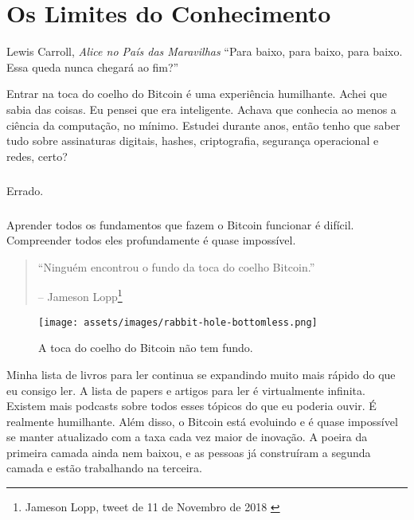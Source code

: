 \chapter{Os Limites do Conhecimento}
\label{les:7}

\begin{chapquote}{Lewis Carroll, \textit{Alice no País das Maravilhas}}
\enquote{Para baixo, para baixo, para baixo. Essa queda nunca chegará ao fim?}
\end{chapquote}

Entrar na toca do coelho do Bitcoin é uma experiência humilhante. Achei que sabia das coisas. Eu pensei que era inteligente. Achava que conhecia ao menos a ciência da computação, no mínimo. Estudei durante anos, então tenho que saber tudo sobre assinaturas digitais, hashes, criptografia, segurança operacional e redes, certo?

\paragraph{}
Errado.

\paragraph{}
Aprender todos os fundamentos que fazem o Bitcoin funcionar é difícil. Compreender todos eles profundamente é quase impossível.

\begin{quotation}\begin{samepage}
\enquote{Ninguém encontrou o fundo da toca do coelho Bitcoin.}
\begin{flushright} -- Jameson Lopp\footnote{Jameson Lopp, tweet de 11 de Novembro de 2018 \cite{lopp-tweet}}
\end{flushright}\end{samepage}\end{quotation}

\begin{figure}
  \centering
  \texttt{[image: assets/images/rabbit-hole-bottomless.png]}
  \caption{A toca do coelho do Bitcoin não tem fundo.}
  \label{fig:rabbit-hole-bottomless}
\end{figure}

Minha lista de livros para ler continua se expandindo muito mais rápido do que eu consigo ler. A lista de papers e artigos para ler é virtualmente infinita. Existem mais podcasts sobre todos esses tópicos do que eu poderia ouvir. É realmente humilhante. Além disso, o Bitcoin está evoluindo e é quase impossível se manter atualizado com a taxa cada vez maior de inovação. A poeira da primeira camada ainda nem baixou, e as pessoas já construíram a segunda camada e estão trabalhando na terceira.

